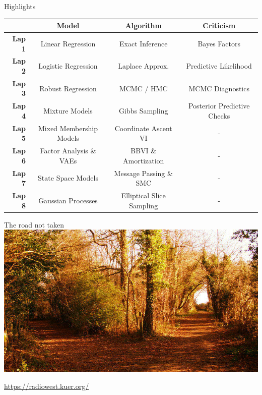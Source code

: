 \documentclass[aspectratio=169]{beamer}
\begin{document}
\begin{frame}{Highlights}
    \begin{table}[]
        \centering
        \begin{tabular}{r|c|c|c}
                            &  \textbf{Model} & \textbf{Algorithm} & \textbf{Criticism}\\
             \hline 
             \textbf{Lap 1} &  Linear Regression & Exact Inference & Bayes Factors \\
             \textbf{Lap 2} &  Logistic Regression & Laplace Approx. & Predictive Likelihood \\
             \textbf{Lap 3} &  Robust Regression & MCMC / HMC & MCMC Diagnostics \\
             \textbf{Lap 4} &  Mixture Models & Gibbs Sampling & Posterior Predictive Checks \\
             \textbf{Lap 5} &  Mixed Membership Models & Coordinate Ascent VI & - \\
             \textbf{Lap 6} &  Factor Analysis \& VAEs & BBVI \& Amortization & - \\
             \textbf{Lap 7} &  State Space Models & Message Passing \& SMC & -\\
             \textbf{Lap 8} &  Gaussian Processes & Elliptical Slice Sampling & - \\
        \end{tabular}
        \label{tab:highlights}
    \end{table}
\end{frame}

\begin{frame}{The road not taken}
\centering
\includegraphics[width=.8\textwidth]{figures/lap9/road.jpeg}

\footnotesize \url{https://radiowest.kuer.org/}
\end{frame}
\end{document}
